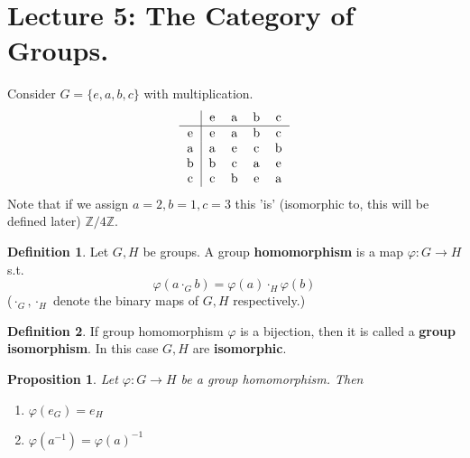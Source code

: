 \documentclass{article}
\newtheorem{theorem}{Proposition}[section]
\theoremstyle{definition}
\newtheorem{definition}{Definition}[section]
\theoremstyle{remark}
\begin{document}
\section{Lecture 5: The Category of Groups.}
Consider $G=\lbrace e,a,b,c\rbrace$ with multiplication.
\begin{equation}
\begin{tabular}{c|cccc}
~&e&a&b&c\\
\hline
e&e&a&b&c\\
a&a&e&c&b\\
b&b&c&a&e\\
c&c&b&e&a\\
\end{tabular}
\end{equation}
Note that if we assign $a=2,b=1,c=3$ this 'is' (isomorphic to, this will be defined later) $\mathbb{Z}/4\mathbb{Z}$.\\
\begin{definition}
\label{GroupHomomorphism}
Let $G,H$ be groups. A group \textbf{homomorphism} is a map $\varphi:G\rightarrow H$ s.t.
\begin{equation}
\varphi(a\cdot_Gb)=\varphi (a)\cdot_H\varphi(b)
\end{equation}
($\cdot_G,\cdot_H$ denote the binary maps of $G,H$ respectively.)\\
\end{definition}
\begin{definition}
If group homomorphism $\varphi$ is a bijection, then it is called a \textbf{group isomorphism}. In this case $G,H$ are \textbf{isomorphic}.\\
\end{definition}
\begin{theorem}
Let $\varphi:G\rightarrow H$ be a group homomorphism. Then
\begin{enumerate}
\item $\varphi(e_G)=e_H$
\item $\varphi(a^{-1})=\varphi(a)^{-1}$ 
\end{enumerate}
\end{theorem}
\end{document}
